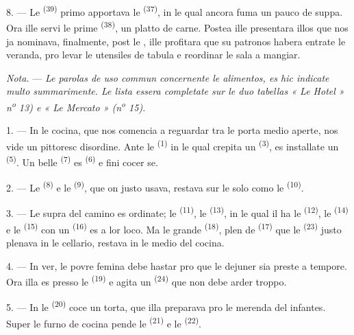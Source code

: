 8. --- Le  \textsuperscript{(39)} primo apportava le
 \textsuperscript{(37)}, in le qual ancora fuma un pauco de
suppa. Ora ille servi le prime  \textsuperscript{(38)}, un platto
de carne. Postea ille presentara illos que nos ja nominava, finalmente, post le
, ille profitara que su patronos habera entrate le
veranda, pro levar le utensiles de tabula e reordinar le sala a mangiar.

\textit{Nota.} --- \textit{Le parolas de uso commun concernente le alimentos, es
hic indicate multo summarimente. Le lista essera completate sur le duo tabellas
« Le Hotel » n\textsuperscript{o} 13) e « Le Mercato »
(n\textsuperscript{o} 15).}

\VUsaut{4.6mm}
\VUsaut{3.0mm}

1. --- In le cocina, que nos comencia a reguardar tra le porta medio aperte, nos
vide un pittoresc disordine. Ante le  \textsuperscript{(1)} in le
qual crepita un  \textsuperscript{(3)}, es installate un
 \textsuperscript{(5)}. Un belle 
\textsuperscript{(7)} es  \textsuperscript{(6)} e fini
cocer se.

2. --- Le  \textsuperscript{(8)} e le  \textsuperscript{(9)}, que on justo usava, restava sur le solo como le
 \textsuperscript{(10)}.

3. --- Le supra del camino es ordinate; le 
\textsuperscript{(11)}, le 
\textsuperscript{(13)}, in le qual il ha le 
\textsuperscript{(12)}, le  \textsuperscript{(14)} e le
 \textsuperscript{(15)} con un 
\textsuperscript{(16)} es a lor loco. Ma le grande 
\textsuperscript{(18)}, plen de  \textsuperscript{(17)}
que le  \textsuperscript{(23)} justo plenava in le cellario,
restava in le medio del cocina.

4. --- In ver, le povre femina debe hastar pro que le dejuner sia preste a
tempore. Ora illa es presso le  \textsuperscript{(19)} e
agita un  \textsuperscript{(24)} que non debe arder troppo.

5. --- In le  \textsuperscript{(20)} coce un torta, que illa
preparava pro le merenda del infantes. Super le furno de cocina pende le
 \textsuperscript{(21)} e le  \textsuperscript{(22)}.

